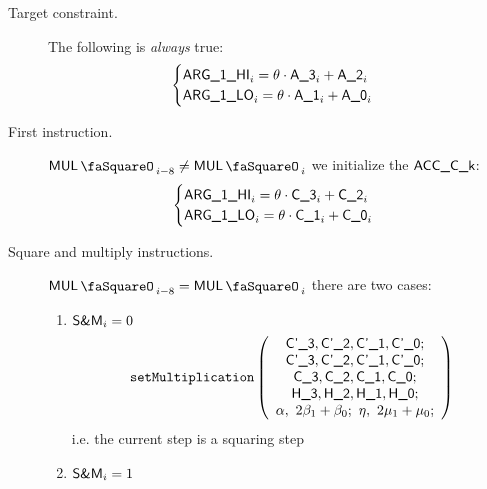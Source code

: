 \begin{center}
\end{center}
\begin{description}
	\item[Target constraint.] The following is \emph{always} true:
		\[
			\begin{cases}
				\textsf{ARG}\textsf{\_1}\textsf{\_HI}_{i} = \theta \cdot \textsf{A\_3}_{i} + \textsf{A\_2}_{i} \\
				\textsf{ARG}\textsf{\_1}\textsf{\_LO}_{i} = \theta \cdot \textsf{A\_1}_{i} + \textsf{A\_0}_{i} \\
			\end{cases}
		\]
	\item[First instruction.] \If $\mulStamp_{i-8} \neq \mulStamp_{i}$ \Then we initialize the $\textsf{ACC}\textsf{\_C\_k}$:
		\[
			\begin{cases}
				\textsf{ARG}\textsf{\_1}\textsf{\_HI}_{i} = \theta \cdot \textsf{C\_3}_{i} + \textsf{C\_2}_{i} \\
				\textsf{ARG}\textsf{\_1}\textsf{\_LO}_{i} = \theta \cdot \textsf{C\_1}_{i} + \textsf{C\_0}_{i} \\
			\end{cases}
		\]
	\item[Square and multiply instructions.] \If $\mulStamp_{i-8} = \mulStamp_{i}$ \Then
		there are two cases:
		\begin{enumerate}
			\item \If $\textsf{S\&M}_{i} = 0$ \Then
				\[
					\texttt{setMultiplication}
					\left( \begin{array}{c}
						\textsf{C'\_3}, \textsf{C'\_2}, \textsf{C'\_1}, \textsf{C'\_0};             \\
						\textsf{C'\_3}, \textsf{C'\_2}, \textsf{C'\_1}, \textsf{C'\_0};             \\
						\textsf{C\_3}, \textsf{C\_2}, \textsf{C\_1}, \textsf{C\_0};                 \\
						\textsf{H\_3}, \textsf{H\_2}, \textsf{H\_1}, \textsf{H\_0};                 \\
						\alpha, ~ 2\beta_{1} + \beta_{0}; ~ \eta, ~ 2\mu_{1} + \mu_{0}; \\
					\end{array} \right)
				\]
				i.e. the current step is a squaring step
			\item \If $\textsf{S\&M}_{i} = 1$ \Then

\end{enumerate}
\end{description}
